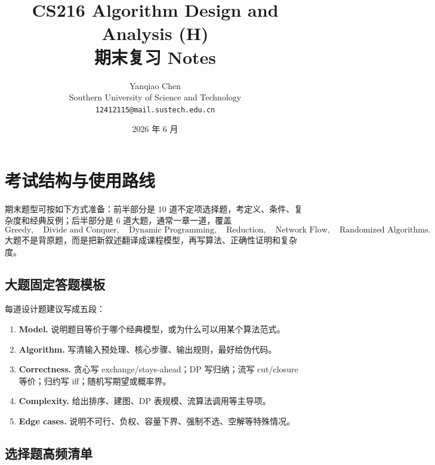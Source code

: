 \documentclass[UTF8,a4paper,11pt]{ctexart}
\title{\textbf{CS216 Algorithm Design and Analysis (H)\\期末复习 Notes}}
\author{Yanqiao Chen \\ 
       Southern University of Science and Technology\\
       \texttt{12412115@mail.sustech.edu.cn}}
\date{2026 年 6 月}
\begin{document}
\maketitle
\tableofcontents
\newpage

\section{考试结构与使用路线}

期末题型可按如下方式准备：前半部分是 $10$ 道不定项选择题，考定义、条件、复杂度和经典反例；后半部分是 $6$ 道大题，通常一章一道，覆盖
\[
\text{Greedy},\quad
\text{Divide and Conquer},\quad
\text{Dynamic Programming},\quad
\text{Reduction},\quad
\text{Network Flow},\quad
\text{Randomized Algorithms}.
\]
大题不是背原题，而是把新叙述翻译成课程模型，再写算法、正确性证明和复杂度。

\subsection{大题固定答题模板}

每道设计题建议写成五段：
\begin{enumerate}
  \item \textbf{Model.} 说明题目等价于哪个经典模型，或为什么可以用某个算法范式。
  \item \textbf{Algorithm.} 写清输入预处理、核心步骤、输出规则，最好给伪代码。
  \item \textbf{Correctness.} 贪心写 exchange/stays-ahead；DP 写归纳；流写 cut/closure 等价；归约写 iff；随机写期望或概率界。
  \item \textbf{Complexity.} 给出排序、建图、DP 表规模、流算法调用等主导项。
  \item \textbf{Edge cases.} 说明不可行、负权、容量下界、强制不选、空解等特殊情况。
\end{enumerate}

\subsection{选择题高频清单}
\end{document}
